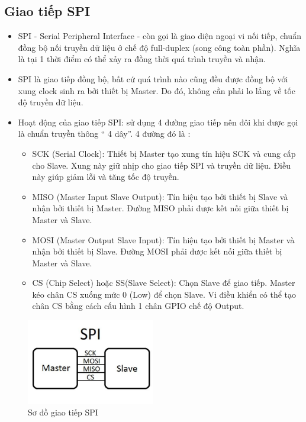 \subsection{Giao tiếp SPI}
\begin{itemize}
    \item SPI - Serial Peripheral Interface - còn gọi là giao diện ngoại vi nối tiếp, chuẩn đồng bộ nối truyền dữ liệu ở chế độ full-duplex (song công toàn phần). Nghĩa là tại 1 thời điểm có thể xảy ra đồng thời quá trình truyền và nhận.
    \item SPI là giao tiếp đồng bộ, bất cứ quá trình nào cũng đều được đồng bộ với xung clock sinh ra bởi thiết bị Master. Do đó, không cần phải lo lắng về tốc độ truyền dữ liệu.
    \item Hoạt động của giao tiếp SPI: sử dụng 4 đường giao tiếp nên đôi khi được gọi là chuẩn truyền thông “ 4 dây”. 4 đường đó là :
    \begin{itemize}
        \item SCK (Serial Clock): Thiết bị Master tạo xung tín hiệu SCK và cung cấp cho Slave. Xung này giữ nhịp cho giao tiếp SPI và truyền dữ liệu. Điều này giúp giảm lỗi và tăng tốc độ truyền.
        \item MISO (Master Input Slave Output): Tín hiệu tạo bởi thiết bị Slave và nhận bởi thiết bị Master. Đường MISO phải được kết nối giữa thiết bị Master và Slave.
        \item MOSI (Master Output Slave Input): Tín hiệu tạo bởi thiết bị Master và nhận bởi thiết bị Slave. Đường MOSI phải được kết nối giữa thiết bị Master và Slave.
        \item CS (Chip Select) hoặc SS(Slave Select): Chọn Slave để giao tiếp. Master kéo chân CS xuống mức 0 (Low) để chọn Slave. Vi điều khiển có thể tạo chân CS bằng cách cấu hình 1 chân GPIO chế độ Output.
    \end{itemize}
\end{itemize}
\begin{figure}[h]
    \centering
    \includegraphics[width=0.5\textwidth]{graphics/spi.jpg}
    \caption{Sơ đồ giao tiếp SPI}
\end{figure}

